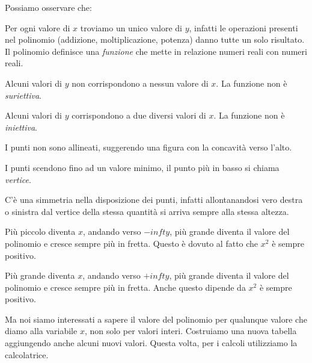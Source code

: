 Possiamo osservare che:
\begin{enumerate*}
 \item Per ogni valore di $x$ troviamo un unico valore di $y$, infatti 
  le operazioni presenti nel polinomio (addizione, moltiplicazione, potenza) 
  danno tutte un solo risultato. Il polinomio definisce una \emph{funzione}
  che mette in relazione numeri reali con numeri reali.
 \item Alcuni valori di $y$ non corrispondono a nessun valore di $x$. 
  La funzione non è \emph{suriettiva}.
 \item Alcuni valori di $y$ corrispondono a due diversi valori di $x$.
  La funzione non è \emph{iniettiva}.
 \item I punti non sono allineati, suggerendo una figura con 
 la concavità verso l'alto.
 \item I punti scendono fino ad un valore minimo, il punto più in basso si 
  chiama \emph{vertice}.
 \item C'è una simmetria nella disposizione dei punti, infatti allontanandosi 
  vero destra o sinistra dal vertice della stessa quantità si arriva sempre 
  alla stessa altezza.
 \item Più piccolo diventa $x$, andando verso $-infty$, più grande diventa il 
  valore del polinomio e cresce sempre più in fretta. 
  Questo è dovuto al fatto che $x^2$ è sempre positivo.
 \item Più grande diventa $x$, andando verso $+infty$, più grande diventa il 
  valore del polinomio e cresce sempre più in fretta. 
  Anche questo dipende da $x^2$ è sempre positivo.
\end{enumerate*}

Ma noi siamo interessati a sapere il valore del polinomio per qualunque valore 
che diamo alla variabile $x$, non solo per valori interi. Costruiamo una nuova 
tabella aggiungendo anche alcuni nuovi valori. Questa volta, per i calcoli 
utilizziamo la calcolatrice.

